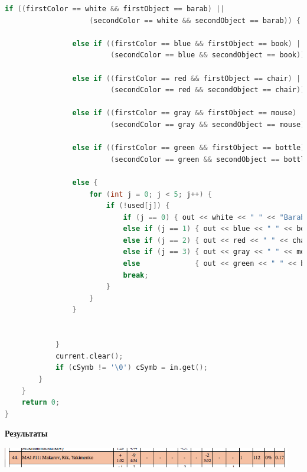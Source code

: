 \documentclass[a4paper,12pt]{article}
\begin{document}
\begin{lstlisting}[language=C++]
                if ((firstColor == white && firstObject == barab) ||
                    (secondColor == white && secondObject == barab)) { out << white << " " << "Barabashka" << endl; }
                
                else if ((firstColor == blue && firstObject == book) ||
                         (secondColor == blue && secondObject == book)) { out << blue << " " << book << endl; }
                
                else if ((firstColor == red && firstObject == chair) ||
                         (secondColor == red && secondObject == chair)) { out << red << " " << chair << endl; }
                
                else if ((firstColor == gray && firstObject == mouse) ||
                         (secondColor == gray && secondObject == mouse)) { out << gray << " " << mouse << endl; }
                
                else if ((firstColor == green && firstObject == bottle) ||
                         (secondColor == green && secondObject == bottle)) { out << green << " " << bottle << endl; }
                
                else {
                    for (int j = 0; j < 5; j++) {
                        if (!used[j]) {
                            if (j == 0) { out << white << " " << "Barabashka" << endl; }
                            else if (j == 1) { out << blue << " " << book << endl; }
                            else if (j == 2) { out << red << " " << chair << endl; }
                            else if (j == 3) { out << gray << " " << mouse << endl; }
                            else             { out << green << " " << bottle << endl; }
                            break;
                        }
                    }
                }
                
                
            }
            current.clear();
            if (cSymb != '\0') cSymb = in.get();
        }
    }
    return 0;
}
\end{lstlisting}

\textbf{{\large Результаты}} \\
\begin{center}
\includegraphics[width=0.95\textwidth]{OC_SPB/OC_SPB_result.png}\\ [1cm]
\end{center}
\end{document}

